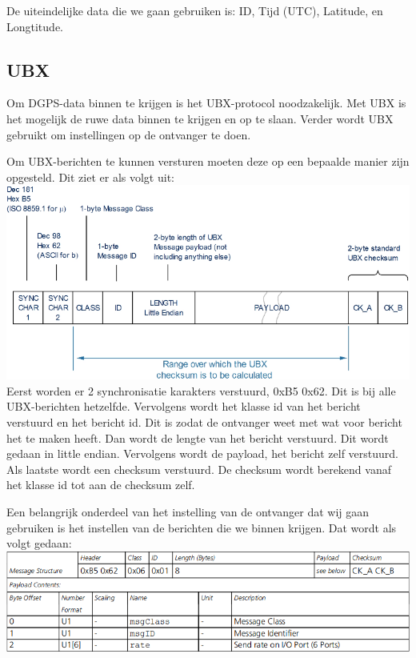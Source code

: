 De uiteindelijke data die we gaan gebruiken is:
ID, Tijd (UTC), Latitude, en Longtitude.

\newpage
\subsection{UBX}
Om DGPS-data binnen te krijgen is het UBX-protocol noodzakelijk. Met UBX is het
mogelijk de ruwe data binnen te krijgen en op te slaan.
Verder wordt UBX gebruikt om instellingen op de ontvanger te doen.

Om UBX-berichten te kunnen versturen moeten deze op een bepaalde manier zijn
opgesteld. Dit ziet er als volgt uit:\\
\includegraphics[width=\textwidth]{technical/ubx}
\citep[p. 132]{UBlox8}\\

Eerst worden er 2 synchronisatie karakters verstuurd, 0xB5 0x62. Dit is bij
alle UBX-berichten hetzelfde. Vervolgens wordt het klasse id van het bericht
verstuurd en het bericht id. Dit is zodat de ontvanger weet met wat voor bericht
het te maken heeft. Dan wordt de lengte van het bericht verstuurd. Dit wordt
gedaan in little endian. Vervolgens wordt de payload, het bericht zelf
verstuurd. Als laatste wordt een checksum verstuurd. De checksum wordt berekend
vanaf het klasse id tot aan de checksum zelf.

Een belangrijk onderdeel van het instelling van de ontvanger dat wij gaan
gebruiken is het instellen van de berichten die we binnen krijgen.
Dat wordt als volgt gedaan:
\includegraphics[width=\textwidth]{technical/set-rate}
\citep[p. 171]{UBlox8}\\

